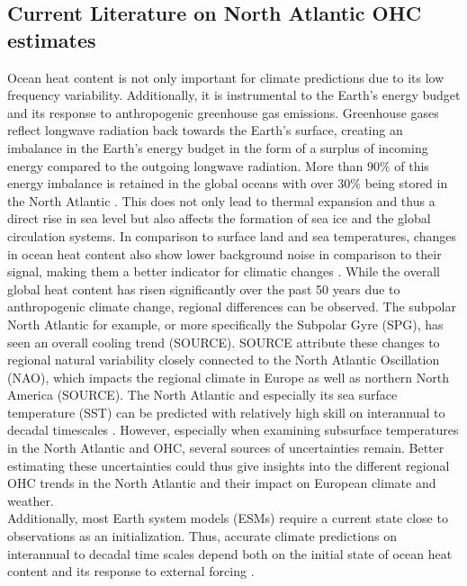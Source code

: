 \documentclass[Masterarbeit.tex]{subfile}
\begin{document}
	\subsection{Current Literature on North Atlantic OHC estimates}
	Ocean heat content is not only important for climate predictions due to its low frequency variability. Additionally, it is instrumental to the Earth's energy budget and its response to anthropogenic greenhouse gas emissions. Greenhouse gases reflect longwave radiation back towards the Earth's surface, creating an imbalance in the Earth's energy budget in the form of a surplus of incoming energy compared to the outgoing longwave radiation. More than $90 \%$ of this energy imbalance is retained in the global oceans with over $30 \%$ being stored in the North Atlantic \citep{hakkinen_heat_2015}. This does not only lead to thermal expansion and thus a direct rise in sea level but also affects the formation of sea ice and the global circulation systems. In comparison to surface land and sea temperatures, changes in ocean heat content also show lower background noise in comparison to their signal, making them a better indicator for climatic changes \citep{cheng_decadal_2018}. While the overall global heat content has risen significantly over the past 50 years due to anthropogenic climate change, regional differences can be observed. The subpolar North Atlantic for example, or more specifically the Subpolar Gyre (SPG), has seen an overall cooling trend (SOURCE). SOURCE attribute these changes to regional natural variability closely connected to the North Atlantic Oscillation (NAO), which impacts the regional climate in Europe as well as northern North America (SOURCE). The North Atlantic and especially its sea surface temperature (SST) can be predicted with relatively high skill on interannual to decadal timescales \citep{buckley_predictability_2019}. However, especially when examining subsurface temperatures in the North Atlantic and OHC, several sources of uncertainties remain. Better estimating these uncertainties could thus give insights into the different regional OHC trends in the North Atlantic and their impact on European climate and weather. \\
	
	
	
	
	
	Additionally, most Earth system models (ESMs) require a current state close to observations as an initialization. Thus, accurate climate predictions on interannual to decadal time scales depend both on the initial state of ocean heat content and its response to external forcing \citep{yeager_decadal_2012}.  \\
	
\end{document}
